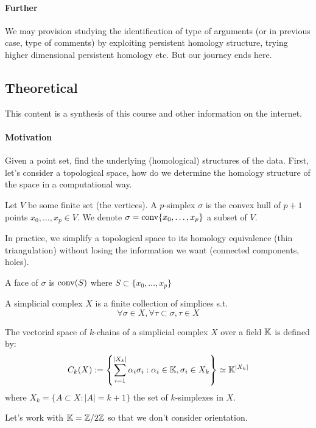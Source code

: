 \paragraph{Further} We may provision studying the identification of type
of arguments (or in previous case, type of comments) by exploiting persistent homology structure,
trying higher dimensional persistent homology etc. But our journey ends here.

\subsection{Theoretical}
\label{theoretical}

This content is a synthesis of this course\cite{INF556} and other
information on the internet.

\paragraph{Motivation} Given a point set, find the underlying (homological) structures of
the data. First, let's consider a topological space, how do we determine
the homology structure of the space in a computational way.

\begin{definition}[$p$-simplex ($p\in\N$)]
  Let $V$ be some finite set (the vertices).
  A $p$-simplex $\sigma$ is the convex hull of $p+1$
  points $x_0, \ldots, x_p \in V$.
  We denote $\sigma = \operatorname{conv}\{x_0, \ldots, x_p\}$ a subset of $V$.
\end{definition}
\RM In practice, we simplify a topological space to its homology equivalence (thin
triangulation) without
losing the information we want (connected components, holes).

\begin{definition}[Face]
  A face of $\sigma$ is $\operatorname{conv}(S)$ where $S\subset\{x_0,\ldots, x_p\}$
\end{definition}

\begin{definition}
  A simplicial complex $X$ is a finite collection of simplices s.t.
  $$
  \forall \sigma\in X, \forall \tau\subset\sigma, \tau\in X
  $$
\end{definition}

\begin{definition}
  The vectorial space of $k$-chains of a simplicial complex $X$ over a field $\mathbb{K}$ is defined by:
  $$
  C_k(X) := \left\{\sum_{i=1}^{\left|X_k\right|} \alpha_i \sigma_i: \alpha_i \in \mathbb{K}, \sigma_i \in X_k\right\}
  \simeq \mathbb{K}^{|X_k|}
  $$
  where $X_k = \{A\subset X : |A|=k+1\}$ the set of $k$-simplexes in $X$.
\end{definition}
\RM Let's work with $\mathbb{K} = \mathbb{Z}/2\mathbb{Z}$ so that we don't consider orientation.


